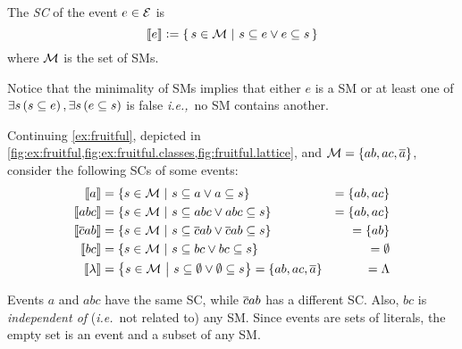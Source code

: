 \documentclass[x11names]{tlp}
\begin{document}
The \textit{\acf{SC}} of the event $e\in {\mathcal{E}}$ is
\begin{equation}
	\left\llbracket e \right\rrbracket := \set{\, s \in \ensuremath{{\mathcal{M}}}\ensuremath{~\middle|~}s \subseteq e \vee e \subseteq s\, } \label{eq:stable.core}
\end{equation}
where ${\mathcal{M}}$ is the set of \aclp{SM}.

Notice that the minimality of \aclp{SM} implies that either $e$ is a \acl{SM} or at least one of $\exists s \del{s \subseteq e}, \exists s \del{e \subseteq s}$ is false \emph{i.e.,}\ no \acl{SM} contains another.

\ifExamples
	\begin{example}
		\label{ex:stable.cores}
		\em

		Continuing \cref{ex:fruitful}, depicted in
		\cref{fig:ex:fruitful,fig:ex:fruitful.classes,fig:fruitful.lattice}, and
		${\mathcal{M}} = \set{ab, ac, \ensuremath{\overline{a}}}$, consider the following \aclp{SC} of some
		events:
		\begin{equation*}
			\begin{aligned}
				\stablecore{a}           & = \set{s \in \MODELset \given s \subseteq a \vee a \subseteq s}                                        & = \set{ab, ac}      %
				\\
				\stablecore{abc}         & = \set{s \in \MODELset \given s \subseteq abc \vee abc \subseteq s}                                    & = \set{ab, ac}      %
				\\
				\stablecore{\co{c}ab}    & = \set{s \in \MODELset \given s \subseteq \co{c}ab \vee \co{c}ab \subseteq s}                          & = \set{ab}          %
				\\
				\stablecore{bc}          & = \set{s \in \MODELset \given s \subseteq bc \vee bc \subseteq s}                                      & = \emptyset         %
				\\
				\stablecore{\emptyevent} & = \set{s \in \MODELset \given s \subseteq \emptyset \vee \emptyset \subseteq s} = \set{ab, ac, \co{a}} & = \consequenceclass %
				\\
			\end{aligned}
		\end{equation*}

		Events $a$ and $abc$ have the same \ac{SC}, while $\overline{c}ab$ has a different
		\ac{SC}.
Also, $bc$ is \emph{independent of} (\emph{i.e.}\ not related to)
		any \acl{SM}.
Since events are sets of literals, the empty set is an event
		and a subset of any \ac{SM}.
	\end{example}
\fi
\end{document}
